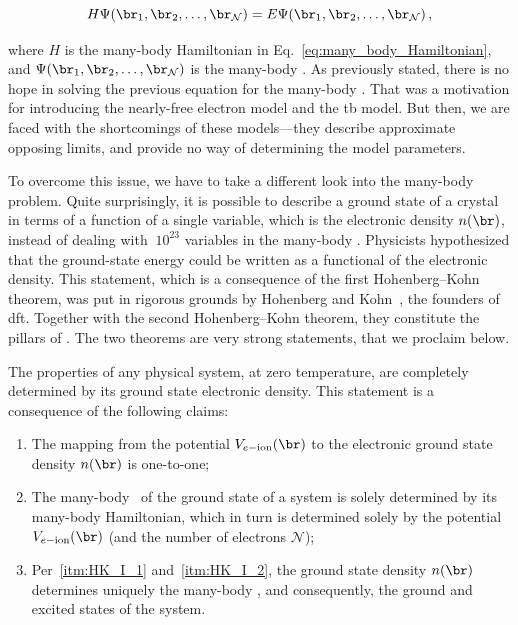 \begin{equation}
    H \Psi(\br_1,\br_2,\dots,\br_{\mathcal{N}}) = E \Psi(\br_1,\br_2,\dots,\br_{\mathcal{N}}) \,,
\end{equation}

\noindent where $H$ is the many-body Hamiltonian in Eq.~\eqref{eq:many_body_Hamiltonian}, and $\Psi(\br_1,\br_2,\dots,\br_{\mathcal{N}})$ is the many-body \wf.
As previously stated, there is no hope in solving the previous equation for the many-body \wf.
That was a motivation for introducing the nearly-free electron model and the \gls{tb} model.
But then, we are faced with the shortcomings of these models---they describe approximate opposing limits, and provide no way of determining the model parameters.

To overcome this issue, we have to take a different look into the many-body problem.
Quite surprisingly, it is possible to describe a ground state of a crystal in terms of a function of a single variable, which is the electronic density $n(\br)$, instead of dealing with $~10^{23}$ variables in the many-body \wf.
Physicists hypothesized that the ground-state energy could be written as a functional of the electronic density.
This statement, which is a consequence of the first Hohenberg--Kohn theorem, was put in rigorous grounds by Hohenberg and Kohn~\cite{Hohenberg_Kohn_1964}, the founders of \gls{dft}\@.
Together with the second Hohenberg--Kohn theorem, they constitute the pillars of \dft\@.
The two theorems are very strong statements, that we proclaim below.

\begin{theorem-non}
    \label{th:HK_theorem_I}
    The properties of any physical system, at zero temperature, are completely determined by its ground state electronic density.
    This statement is a consequence of the following claims:

    \begin{enumerate}[label=(\arabic*),ref=(\arabic*)]
        \item The mapping from the potential $V_{e-\mathrm{ion}}(\br)$ to the electronic ground state density $n(\br)$ is one-to-one;\label{itm:HK_I_1}
        \item The many-body \wf~of the ground state of a system is solely determined by its many-body Hamiltonian, which in turn is determined solely by the potential $V_{e-\mathrm{ion}}(\br)$ (and the number of electrons $\mathcal{N}$);\label{itm:HK_I_2}
        \item Per~\ref{itm:HK_I_1} and~\ref{itm:HK_I_2}, the ground state density $n(\br)$ determines uniquely the many-body \wf, and consequently, the ground and excited states of the system.
    \end{enumerate}
\end{theorem-non}


